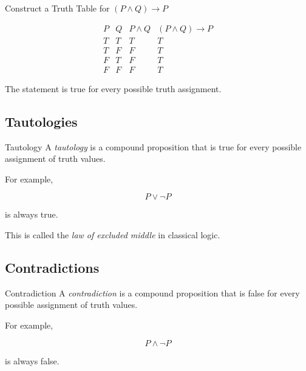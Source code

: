 \begin{workedexamplebox}{Construct a Truth Table for \((P\land Q)\to P\)}

\[
\begin{array}{c|c|c|c}
P & Q & P\land Q & (P\land Q)\to P\\ \hline
T & T & T & T\\
T & F & F & T\\
F & T & F & T\\
F & F & F & T
\end{array}
\]

\begin{answerbox}
The statement is true for every possible truth assignment.
\end{answerbox}
\end{workedexamplebox}

\subsection{Tautologies}
\label{subsec:tautologies}

\begin{definitionbox}{Tautology}
A \emph{tautology} is a compound proposition that is true for every possible
assignment of truth values.
\end{definitionbox}

For example,

\[ P\lor\neg P \]

is always true.

This is called the \emph{law of excluded middle} in classical logic.

\subsection{Contradictions}
\label{subsec:contradictions}

\begin{definitionbox}{Contradiction}
A \emph{contradiction} is a compound proposition that is false for every
possible assignment of truth values.
\end{definitionbox}

For example,

\[ P\land\neg P \]

is always false.

